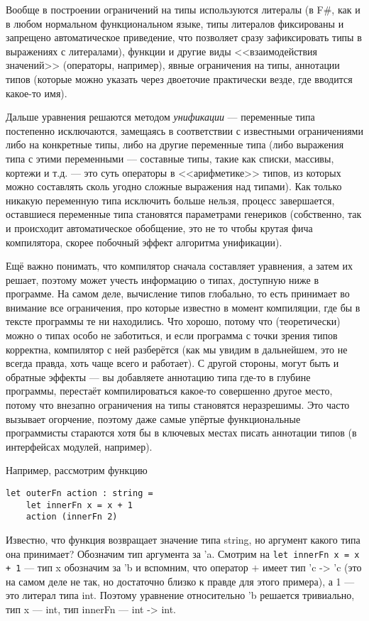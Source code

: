 \documentclass{../../text-style}
\begin{document}
Вообще в построении ограничений на типы используются литералы (в F\#, как и в любом нормальном функциональном языке, типы литералов фиксированы и запрещено автоматическое приведение, что позволяет сразу зафиксировать типы в выражениях с литералами), функции и другие виды <<взаимодействия значений>> (операторы, например), явные ограничения на типы, аннотации типов (которые можно указать через двоеточие практически везде, где вводится какое-то имя).

Дальше уравнения решаются методом \emph{унификации} --- переменные типа постепенно исключаются, замещаясь в соответствии с известными ограничениями либо на конкретные типы, либо на другие переменные типа (либо выражения типа с этими переменными --- составные типы, такие как списки, массивы, кортежи и т.д. --- это суть операторы в <<арифметике>> типов, из которых можно составлять сколь угодно сложные выражения над типами). Как только никакую переменную типа исключить больше нельзя, процесс завершается, оставшиеся переменные типа становятся параметрами генериков (собственно, так и происходит автоматическое обобщение, это не то чтобы крутая фича компилятора, скорее побочный эффект алгоритма унификации). 

Ещё важно понимать, что компилятор сначала составляет уравнения, а затем их решает, поэтому может учесть информацию о типах, доступную ниже в программе. На самом деле, вычисление типов глобально, то есть принимает во внимание все ограничения, про которые известно в момент компиляции, где бы в тексте программы те ни находились. Что хорошо, потому что (теоретически) можно о типах особо не заботиться, и если программа с точки зрения типов корректна, компилятор с ней разберётся (как мы увидим в дальнейшем, это не всегда правда, хоть чаще всего и работает). С другой стороны, могут быть и обратные эффекты --- вы добавляете аннотацию типа где-то в глубине программы, перестаёт компилироваться какое-то совершенно другое место, потому что внезапно ограничения на типы становятся неразрешимы. Это часто вызывает огорчение, поэтому даже самые упёртые функциональные программисты стараются хотя бы в ключевых местах писать аннотации типов (в интерфейсах модулей, например).

Например, рассмотрим функцию

\begin{verbatim}
let outerFn action : string =
    let innerFn x = x + 1
    action (innerFn 2)
\end{verbatim}

Известно, что функция возвращает значение типа string, но аргумент какого типа она принимает? Обозначим тип аргумента за 'a. Смотрим на \texttt{let innerFn x = x + 1} --- тип x обозначим за 'b и вспомним, что оператор $+$ имеет тип 'c -> 'c  (это на самом деле не так, но достаточно близко к правде для этого примера), а 1 --- это литерал типа int. Поэтому уравнение относительно 'b решается тривиально, тип x --- int, тип innerFn --- int -> int. 
\end{document}
